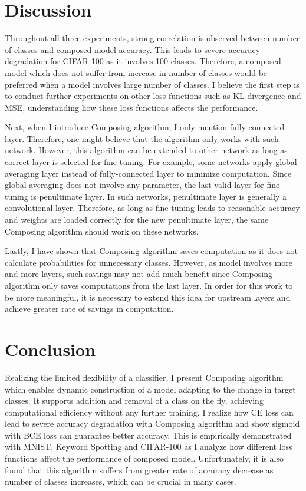 \documentclass{article}
\begin{document}
\section{Discussion}

Throughout all three experiments, strong correlation is observed between number of classes and composed model accuracy. This leads to severe accuracy degradation for CIFAR-100 as it involves 100 classes. Therefore, a composed model which does not suffer from increase in number of classes would be preferred when a model involves large number of classes. I believe the first step is to conduct further experiments on other loss functions such as KL divergence and MSE, understanding how these loss functions affects the performance.

Next, when I introduce Composing algorithm, I only mention fully-connected layer. Therefore, one might believe that the algorithm only works with such network. However, this algorithm can be extended to other network as long as correct layer is selected for fine-tuning. For example, some networks apply global averaging layer instead of fully-connected layer to minimize computation. Since global averaging does not involve any parameter, the last valid layer for fine-tuning is penultimate layer. In such networks, penultimate layer is generally a convolutional layer. Therefore, as long as fine-tuning leads to reasonable accuracy and weights are loaded correctly for the new penultimate layer, the same Composing algorithm should work on these networks.

Lastly, I have shown that Composing algorithm saves computation as it does not calculate probabilities for unnecessary classes. However, as model involves more and more layers, such savings may not add much benefit since Composing algorithm only saves computations from the last layer. In order for this work to be more meaningful, it is necessary to extend this idea for upstream layers and achieve greater rate of savings in computation.

\section{Conclusion}

Realizing the limited flexibility of a classifier, I present Composing algorithm which enables dynamic construction of a model adapting to the change in target classes. It supports addition and removal of a class on the fly, achieving computational efficiency without any further training. I realize how CE loss can lead to severe accuracy degradation with Composing algorithm and show sigmoid with BCE loss can guarantee better accuracy. This is empirically demonstrated with MNIST, Keyword Spotting and CIFAR-100 as I analyze how different loss functions affect the performance of composed model. Unfortunately, it is also found that this algorithm suffers from greater rate of accuracy decrease as number of classes increases, which can be crucial in many cases.

\newpage

\nocite{*}



\end{document}
